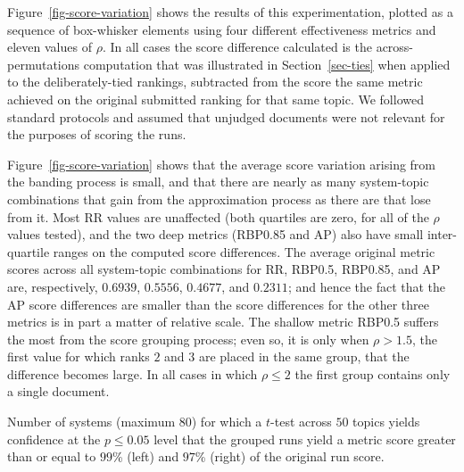 Figure~\ref{fig-score-variation} shows the results of this
experimentation, plotted as a sequence of box-whisker elements using
four different effectiveness metrics and eleven values of $\rho$.
In all cases the score difference calculated is the
across-permutations computation that was illustrated in
Section~\ref{sec-ties} when applied to the deliberately-tied
rankings, subtracted from the score the same metric achieved on the
original submitted ranking for that same topic.
We followed standard protocols and assumed that unjudged documents
were not relevant for the purposes of scoring the runs.

Figure~\ref{fig-score-variation} shows that the average score
variation arising from the banding process is small, and that there
are nearly as many system-topic combinations that gain from the
approximation process as there are that lose from it.
Most RR values are unaffected (both quartiles are zero, for all of
the $\rho$ values tested), and the two deep metrics (RBP0.85 and
AP) also have small inter-quartile ranges on the computed score
differences.
The average original metric scores across all system-topic
combinations for RR, RBP0.5, RBP0.85, and AP are, respectively,
$0.6939$, $0.5556$, $0.4677$, and $0.2311$; and hence the fact that
the AP score differences are smaller than the score differences for
the other three metrics is in part a matter of relative scale.
The shallow metric RBP0.5 suffers the most from the score grouping
process; even so, it is only when $\rho>1.5$, the first value for
which ranks $2$ and $3$ are placed in the same group, that the
difference becomes large.
In all cases in which $\rho\le2$ the first group contains only a
single document.

\begin{table}[t!]
\centering

\caption{Number of systems (maximum $80$) for which a $t$-test across
$50$ topics yields confidence at the $p\le0.05$ level that the
grouped runs yield a metric score greater than or equal to $99$\%
(left) and $97$\% (right) of the original run score.
\label{tbl-frac-significant}}
\end{table}

